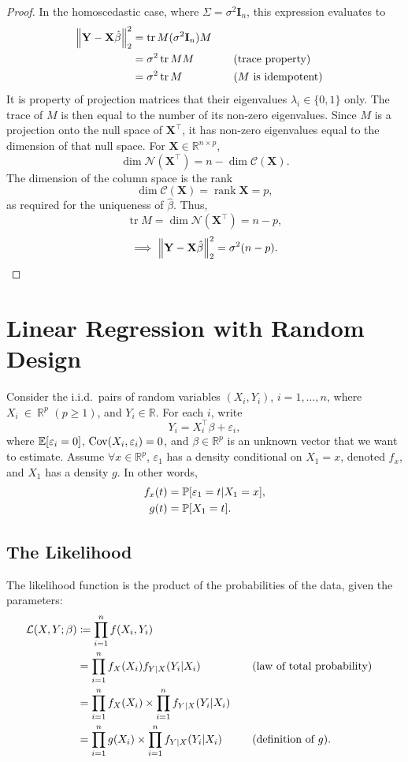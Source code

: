 \documentclass[letterpaper, reqno]{amsart}
\numberwithin{equation}{section}
\DeclarePairedDelimiter{\norm}{\lVert}{\rVert}
\newcommand{\T}{\top} %
\newcommand{\vect}[1]{\boldsymbol{\mathbf{#1}}} %
\newcommand{\Prob}[1]{\mathbb{P}\mleft[#1\mright]}
\newcommand{\E}[1]{\mathbb{E}\mleft[#1\mright]}
\newcommand{\Cov}[1]{\operatorname{Cov}\mleft(#1\mright)}
\newcommand{\Li}[1]{\mathcal{L}\mleft( #1 \mright)}  %
\newcommand{\R}{\mathbb{R}}  %
\newcommand{\iid}{i.i.d.}
\newcommand{\by}[1]{&\quad&\text{(#1)}}
\newcommand{\Xm}{\vect{X}}
\newcommand{\Yv}{\vect{Y}}
\newcommand{\Bv}{\beta}
\newcommand{\Bvh}{\hat{\beta}}
\newcommand{\ve}{\varepsilon}
\DeclareMathOperator{\tr}{tr}
\DeclareMathOperator{\rank}{rank}
\begin{document}
\begin{proof}
  In the homoscedastic case, where $\Sigma = \sigma^2 \vect{I}_n$, this expression
  evaluates to 
  \begin{alignat*}{3}
    \norm*{\Yv - \Xm\Bvh}_2^2 &= \tr M(\sigma^2 \vect{I}_n) M \\
    &= \sigma^2 \tr M M \by{trace property} \\
    &= \sigma^2 \tr M \by {$M$ is idempotent}
  \end{alignat*}
  It is property of projection matrices that their eigenvalues $\lambda_i \in
  \{0, 1\}$ only.
  The trace of $M$ is then equal to the number of its non-zero eigenvalues.
  Since $M$ is a projection onto the null space of $\Xm^\T$, it has non-zero
  eigenvalues equal to the dimension of that null space.
  For $\Xm \in \R^{n \times p}$,
  \[ \dim\mathscr{N}(\Xm^\T) = n - \dim \mathscr{C}(\Xm). \]
  The dimension of the column space is the rank
  \[ \dim \mathscr{C}(\Xm) = \rank \Xm = p, \]
  as required for the uniqueness of $\Bvh$. Thus,
  \[ \tr M = \dim\mathscr{N}(\Xm^\T) = n - p, \]
  \[ \implies \norm*{\Yv - \Xm\Bvh}_2^2 = \sigma^2 (n - p). \qedhere \]
\end{proof}

\clearpage
\section{Linear Regression with Random Design}
Consider the \iid\ pairs of random variables $(X_i, Y_i)$, $i = 1, \dots, n$,
where $X_i~\in~\R^p$ $(p \ge 1)$, and $Y_i \in \R$. For each $i$, write
\[ Y_i = X_i^\T \Bv + \ve_i, \]
where $\E{\ve_i = 0}$, $\Cov{X_i, \ve_i} = 0$, and $\Bv \in \R^p$ is an unknown
vector that we want to estimate. Assume $\forall x \in \R^p$, $\ve_1$ has
a density conditional on $X_1 = x$, denoted $f_x$, and $X_1$ has a density $g$.
In other words,
\begin{align*}
  f_x(t) &= \Prob{\ve_1 = t | X_1 = x}, \\
  g(t) &= \Prob{X_1 = t}.
\end{align*}

\subsection{The Likelihood}
The likelihood function is the product of the probabilities of the data, given
the parameters:
\begin{alignat*}{3}
  \Li{X, Y; \Bv} &\coloneqq \prod_{i=1}^n f(X_i, Y_i) \\
  &= \prod_{i=1}^n f_X(X_i) f_{Y|X}(Y_i | X_i) \by{law of total probability} \\
  &= \prod_{i=1}^n f_X(X_i) \times \prod_{i=1}^n f_{Y|X}(Y_i | X_i) \\
  &= \prod_{i=1}^n g(X_i) \times \prod_{i=1}^n f_{Y|X}(Y_i | X_i) \by{definition of $g$}.
\end{alignat*}
\end{document}
